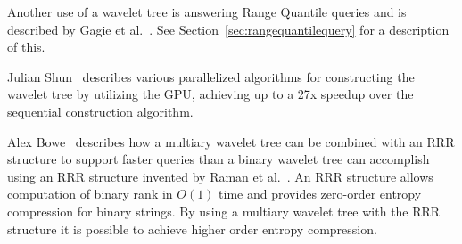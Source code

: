Another use of a wavelet tree is answering Range Quantile queries and is described by Gagie et al.~.
See Section~\ref{sec:rangequantilequery} for a description of this.

Julian Shun~ describes various parallelized algorithms for constructing the wavelet tree by utilizing the GPU, achieving up to a 27x speedup over the sequential construction algorithm.

Alex Bowe~ describes how a multiary wavelet tree can be combined with an RRR structure to support faster queries than a binary wavelet tree can accomplish using an RRR structure invented by Raman et al.~.
An RRR structure allows computation of binary rank in $O(1)$ time and provides zero-order entropy compression for binary strings.
By using a multiary wavelet tree with the RRR structure it is possible to achieve higher order entropy compression.





